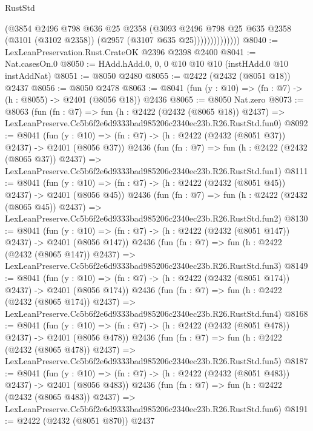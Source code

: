 \begin{lexlean}{RustStd}
\begin{coremodule}
                        (@3854
                          @2496
                          @798
                          @636
                          @25
                          @2358
                          (@3093
                            @2496
                            @798
                            @25
                            @635
                            @2358
                            (@3101 (@3102 @2358))
                            (@2957 (@3107 @635 @25))))))))))))))
@8040 := LexLeanPreservation.Rust.CrateOK @2396 @2398 @2400
@8041 := Nat.casesOn.{0}
@8050 := HAdd.hAdd.{0, 0, 0} @10 @10 @10 (instHAdd.{0} @10 instAddNat)
@8051 := @8050 @2480
@8055 := @2422 (@2432 (@8051 @18)) @2437
@8056 := @8050 @2478
@8063 := @8041 (fun (y : @10) => (fn : @7) -> (h : @8055) -> @2401 (@8056 @18)) @2436
@8065 := @8050 Nat.zero
@8073 := @8063
    (fun (fn : @7) =>
    fun (h : @2422 (@2432 (@8065 @18)) @2437) =>
    LexLeanPreserve.Cc5b6f2e6d9333bad985206c2340ec23b.R26.RustStd.fun0)
@8092 := @8041
    (fun (y : @10) => (fn : @7) -> (h : @2422 (@2432 (@8051 @37)) @2437) -> @2401 (@8056 @37))
    @2436
    (fun (fn : @7) =>
    fun (h : @2422 (@2432 (@8065 @37)) @2437) =>
    LexLeanPreserve.Cc5b6f2e6d9333bad985206c2340ec23b.R26.RustStd.fun1)
@8111 := @8041
    (fun (y : @10) => (fn : @7) -> (h : @2422 (@2432 (@8051 @45)) @2437) -> @2401 (@8056 @45))
    @2436
    (fun (fn : @7) =>
    fun (h : @2422 (@2432 (@8065 @45)) @2437) =>
    LexLeanPreserve.Cc5b6f2e6d9333bad985206c2340ec23b.R26.RustStd.fun2)
@8130 := @8041
    (fun (y : @10) => (fn : @7) -> (h : @2422 (@2432 (@8051 @147)) @2437) -> @2401 (@8056 @147))
    @2436
    (fun (fn : @7) =>
    fun (h : @2422 (@2432 (@8065 @147)) @2437) =>
    LexLeanPreserve.Cc5b6f2e6d9333bad985206c2340ec23b.R26.RustStd.fun3)
@8149 := @8041
    (fun (y : @10) => (fn : @7) -> (h : @2422 (@2432 (@8051 @174)) @2437) -> @2401 (@8056 @174))
    @2436
    (fun (fn : @7) =>
    fun (h : @2422 (@2432 (@8065 @174)) @2437) =>
    LexLeanPreserve.Cc5b6f2e6d9333bad985206c2340ec23b.R26.RustStd.fun4)
@8168 := @8041
    (fun (y : @10) => (fn : @7) -> (h : @2422 (@2432 (@8051 @478)) @2437) -> @2401 (@8056 @478))
    @2436
    (fun (fn : @7) =>
    fun (h : @2422 (@2432 (@8065 @478)) @2437) =>
    LexLeanPreserve.Cc5b6f2e6d9333bad985206c2340ec23b.R26.RustStd.fun5)
@8187 := @8041
    (fun (y : @10) => (fn : @7) -> (h : @2422 (@2432 (@8051 @483)) @2437) -> @2401 (@8056 @483))
    @2436
    (fun (fn : @7) =>
    fun (h : @2422 (@2432 (@8065 @483)) @2437) =>
    LexLeanPreserve.Cc5b6f2e6d9333bad985206c2340ec23b.R26.RustStd.fun6)
@8191 := @2422 (@2432 (@8051 @870)) @2437

\end{coremodule}
\end{lexlean}
